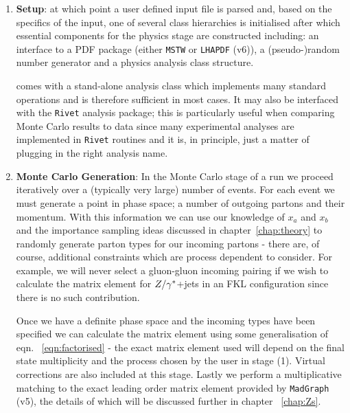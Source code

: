 		\begin{enumerate}
			\item \textbf{Setup}: at which point a user defined input file is parsed
			and, based on the specifics of the input, one of several class hierarchies is
			initialised after which essential components for the physics stage are constructed including:
			an interface to a PDF package (either \texttt{MSTW} or \texttt{LHAPDF} (v6)), a
			(pseudo-)random number generator and a physics analysis class structure.

			\HEJ comes with a stand-alone analysis class which implements many standard operations
			and is therefore sufficient in most cases.  It may also be interfaced with the
			\texttt{Rivet} analysis package; this is particularly useful when comparing Monte
			Carlo results to data since many experimental analyses are implemented in \texttt{Rivet}
			routines and it is, in principle, just a matter of plugging in the right analysis name.

			\item \textbf{Monte Carlo Generation}: In the Monte Carlo stage of a \HEJ run we
			proceed iteratively over a (typically very large) number of events.  For each
			event we must generate a point in phase space; a number of outgoing partons and their
			momentum.  With this information we can use our knowledge of $x_a$
			and $x_b$ and the importance sampling ideas discussed in chapter~\ref{chap:theory}
			to randomly generate parton types for our incoming partons - there are, of course,
			additional constraints which are process dependent to consider.  For example, we
			will never select a gluon-gluon incoming pairing if we wish to calculate the matrix
			element for $Z/\gamma^*$+jets in an FKL configuration since there is no such contribution.

			Once we have a definite phase space and the incoming types have been
			specified we can calculate the matrix element using some generalisation of eqn.
			~\eqref{eqn:factorised} - the exact matrix element used will depend on the
			final state multiplicity and the process chosen by the user in stage (1).  Virtual
			corrections are also included at this stage.  Lastly we perform a
			multiplicative matching to the exact leading order matrix element provided by
			\texttt{MadGraph} (v5), the details of which will be discussed further in chapter
			~\ref{chap:Zs}.


\end{enumerate}
